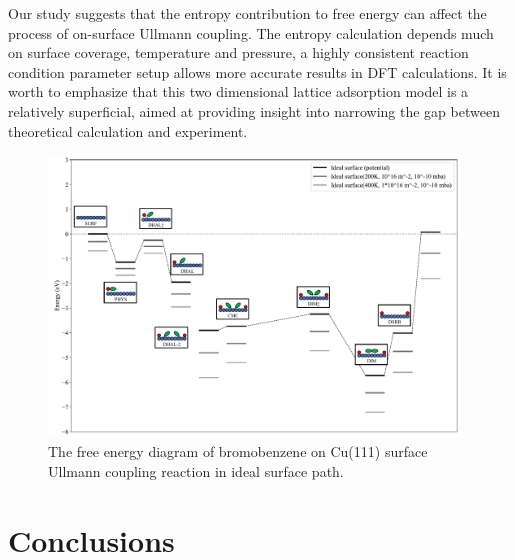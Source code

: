 \documentclass[%
 reprint,
 amsmath,amssymb,
 aps,
prb,
floatfix,
]{revtex4-2}
\newcommand{\zhzh}{\color{blue}}
\newcommand{\zhzh}{\color{black}}
\begin{document}
{Our study suggests that the entropy contribution to free energy can affect the process of on-surface Ullmann coupling. The entropy calculation depends much on surface coverage, temperature and pressure, a highly consistent reaction condition parameter setup allows more accurate results in DFT calculations. It is worth to emphasize that this two dimensional lattice adsorption model is a relatively superficial, aimed at providing insight into narrowing the gap between theoretical calculation and experiment. 
}

\begin{figure}[hbt]
\centering
\includegraphics[width=0.98\textwidth]{Fig/entropy-correction.pdf}
\caption{The free energy diagram of bromobenzene on Cu(111) surface Ullmann coupling reaction in ideal surface path.}
\label{fig:entropy}
\end{figure}

\fi


\section{Conclusions}


\end{document}
